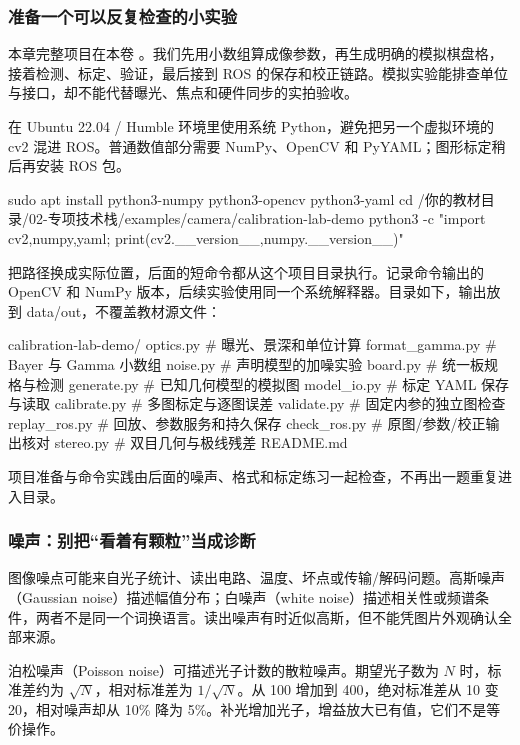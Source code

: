 \subsubsection{准备一个可以反复检查的小实验}
本章完整项目在本卷 。我们先用小数组算成像参数，再生成明确的模拟棋盘格，接着检测、标定、验证，最后接到 ROS 的保存和校正链路。模拟实验能排查单位与接口，却不能代替曝光、焦点和硬件同步的实拍验收。
\begin{example}[安装依赖并进入项目]
在 Ubuntu 22.04 / Humble 环境里使用系统 Python，避免把另一个虚拟环境的 cv2 混进 ROS。普通数值部分需要 NumPy、OpenCV 和 PyYAML；图形标定稍后再安装 ROS 包。
\begin{tbash}
sudo apt install python3-numpy python3-opencv python3-yaml
cd /你的教材目录/02-专项技术栈/examples/camera/calibration-lab-demo
python3 -c "import cv2,numpy,yaml; print(cv2.__version__,numpy.__version__)"
\end{tbash}
把路径换成实际位置，后面的短命令都从这个项目目录执行。记录命令输出的 OpenCV 和 NumPy 版本，后续实验使用同一个系统解释器。目录如下，输出放到 data/out，不覆盖教材源文件：
\begin{tbash}
calibration-lab-demo/
  optics.py            # 曝光、景深和单位计算
  format_gamma.py      # Bayer 与 Gamma 小数组
  noise.py             # 声明模型的加噪实验
  board.py             # 统一板规格与检测
  generate.py          # 已知几何模型的模拟图
  model_io.py          # 标定 YAML 保存与读取
  calibrate.py         # 多图标定与逐图误差
  validate.py          # 固定内参的独立图检查
  replay_ros.py        # 回放、参数服务和持久保存
  check_ros.py         # 原图/参数/校正输出核对
  stereo.py            # 双目几何与极线残差
  README.md
\end{tbash}
项目准备与命令实践由后面的噪声、格式和标定练习一起检查，不再出一题重复进入目录。
\end{example}

\subsubsection{噪声：别把“看着有颗粒”当成诊断}
图像噪点可能来自光子统计、读出电路、温度、坏点或传输/解码问题。高斯噪声（Gaussian noise）描述幅值分布；白噪声（white noise）描述相关性或频谱条件，两者不是同一个词换语言。读出噪声有时近似高斯，但不能凭图片外观确认全部来源。

泊松噪声（Poisson noise）可描述光子计数的散粒噪声。期望光子数为 $N$ 时，标准差约为 $\sqrt N$，相对标准差为 $1/\sqrt N$。从 100 增加到 400，绝对标准差从 10 变 20，相对噪声却从 10\% 降为 5\%。补光增加光子，增益放大已有值，它们不是等价操作。

